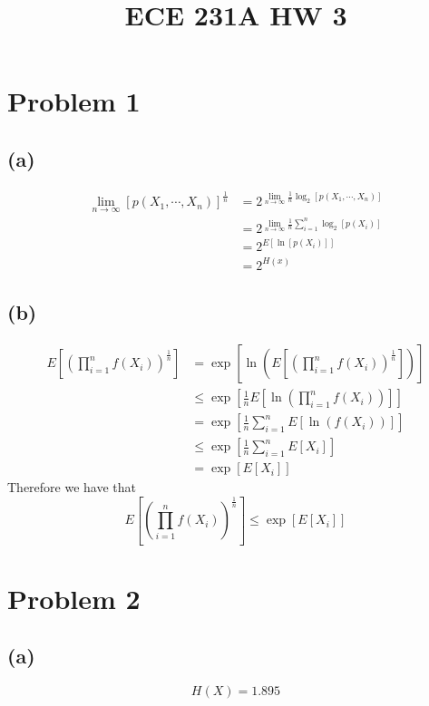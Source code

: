 
\title{ECE 231A HW 3}

\maketitle
\section*{Problem 1}
\subsection*{(a)}
\begin{align*}
    \lim_{n\to\infty}[p(X_1,\cdots,X_n)]^{\frac{1}{n}}&=
        2^{\lim_{n\to\infty}\frac{1}{n}\log_2[p(X_1,\cdots,X_n)]}\\
    &=2^{\lim_{n\to\infty}\frac{1}{n}\sum_{i=1}^n\log_2[p(X_i)]}\\
    &=2^{E[\ln[p(X_i)]]}\\
    &=\boxed{2^{H(x)}}
\end{align*}
\subsection*{(b)}
\begin{align*}
    E\left[\left(\prod_{i=1}^nf(X_i)\right)^{\frac{1}{n}}\right]&=
        \exp\left[\ln\left(E\left[\left(\prod_{i=1}^nf(X_i)\right)^{\frac{1}{n}}\right]\right)\right]\\
        
    &\leq \exp\left[\frac{1}{n}E\left[\ln\left(\prod_{i=1}^nf(X_i)\right)\right]\right]\\
    &=\exp\left[\frac{1}{n}\sum_{i=1}^nE\left[\ln\left(f(X_i)\right)\right]\right]\\
    &\leq \exp\left[\frac{1}{n}\sum_{i=1}^nE[X_i]\right]\\
    &=\exp\left[E[X_i]\right]
\end{align*}
Therefore we have that
$$
    \boxed{E\left[\left(\prod_{i=1}^nf(X_i)\right)^{\frac{1}{n}}\right]\leq \exp\left[E[X_i]\right]}
    $$
\section*{Problem 2}
\subsection*{(a)}
$$H(X)=\boxed{1.895}$$
